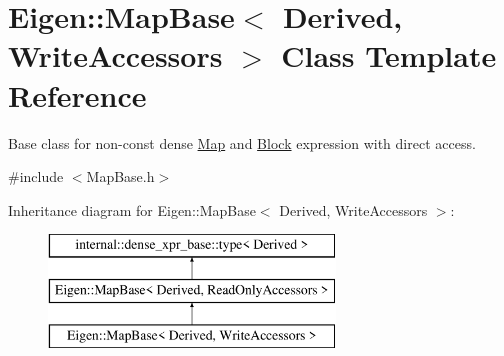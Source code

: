\hypertarget{class_eigen_1_1_map_base_3_01_derived_00_01_write_accessors_01_4}{}\section{Eigen\+::Map\+Base$<$ Derived, Write\+Accessors $>$ Class Template Reference}
\label{class_eigen_1_1_map_base_3_01_derived_00_01_write_accessors_01_4}


Base class for non-\/const dense \mbox{\hyperlink{class_eigen_1_1_map}{Map}} and \mbox{\hyperlink{class_eigen_1_1_block}{Block}} expression with direct access.  




{\ttfamily \#include $<$Map\+Base.\+h$>$}

Inheritance diagram for Eigen\+::Map\+Base$<$ Derived, Write\+Accessors $>$\+:\begin{figure}[H]
\begin{center}
\leavevmode
\includegraphics[height=3.000000cm]{class_eigen_1_1_map_base_3_01_derived_00_01_write_accessors_01_4}
\end{center}
\end{figure}
